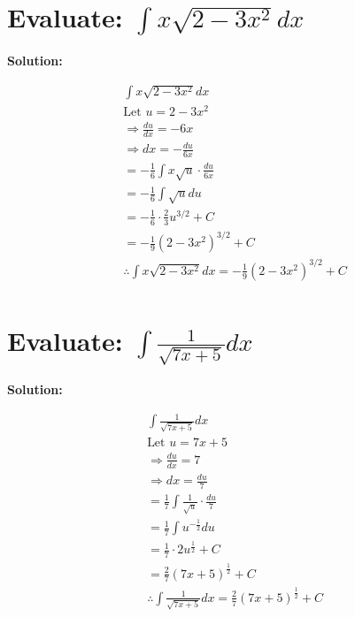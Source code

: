 \documentclass{article}
\begin{document}
\newpage
\section{Evaluate: $\int x \sqrt{2 - 3x^2} dx$}

\textbf{Solution:}

\begin{align*}
     & \int x \sqrt{2 - 3x^2} dx                                                \\
     & \text{Let } u = 2 - 3x^2                                                 \\
     & \Rightarrow \frac{du}{dx} = -6x                                          \\
     & \Rightarrow dx = -\frac{du}{6x}                                          \\
     & =-\frac{1}{6} \int x \sqrt{u} \cdot \frac{du}{6x}                        \\
     & =-\frac{1}{6} \int \sqrt{u} du                                           \\
     & =-\frac{1}{6} \cdot \frac{2}{3} u^{3/2} + C                              \\
     & =-\frac{1}{9} (2 - 3x^2)^{3/2} + C                                       \\
     & \therefore \int x \sqrt{2 - 3x^2} dx = -\frac{1}{9} (2 - 3x^2)^{3/2} + C \\
\end{align*}

\newpage
\section{Evaluate: $\int \frac{1}{\sqrt{7x + 5}} dx$}

\textbf{Solution:}

\begin{align*}
     & \int \frac{1}{\sqrt{7x + 5}} dx                                                     \\
     & \text{Let } u = 7x + 5                                                              \\
     & \Rightarrow \frac{du}{dx} = 7                                                       \\
     & \Rightarrow dx = \frac{du}{7}                                                       \\
     & =\frac{1}{7} \int \frac{1}{\sqrt{u}} \cdot \frac{du}{7}                             \\
     & =\frac{1}{7} \int u^{-\frac{1}{2}} du                                               \\
     & =\frac{1}{7} \cdot 2u^{\frac{1}{2}} + C                                             \\
     & =\frac{2}{7} (7x + 5)^{\frac{1}{2}} + C                                             \\
     & \therefore \int \frac{1}{\sqrt{7x + 5}} dx = \frac{2}{7} (7x + 5)^{\frac{1}{2}} + C
\end{align*}
\end{document}
